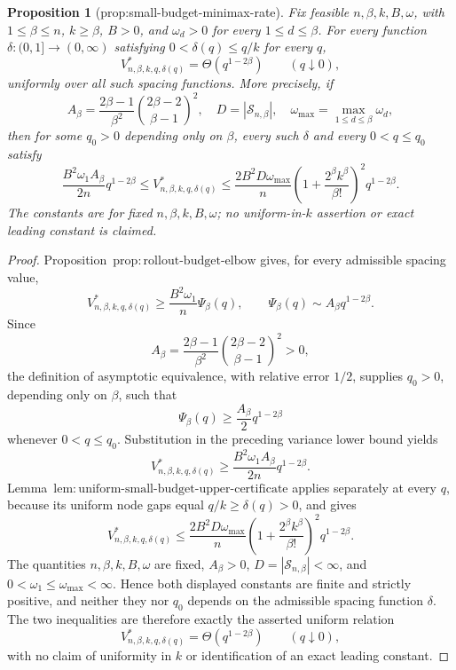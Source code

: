 \documentclass{article}
\newtheorem{proposition}{Proposition}
\begin{document}
\begin{proposition}[prop:small-budget-minimax-rate]\label{prop:small-budget-minimax-rate}
Fix feasible \(n,\beta,k,B,\omega\), with \(1\le\beta\le n\), \(k\ge\beta\), \(B>0\), and \(\omega_d>0\) for every \(1\le d\le\beta\).  For every function \(\delta:(0,1]\to(0,\infty)\) satisfying \(0<\delta(q)\le q/k\) for every \(q\),
\[
V^*_{n,\beta,k,q,\delta(q)}=\Theta(q^{1-2\beta})
\qquad(q\downarrow0),
\]
uniformly over all such spacing functions.  More precisely, if
\[
A_\beta=\frac{2\beta-1}{\beta^2}
\binom{2\beta-2}{\beta-1}^{\!2},
\quad D=|\mathcal S_{n,\beta}|,
\quad \omega_{\max}=\max_{1\le d\le\beta}\omega_d,
\]
then for some \(q_0>0\) depending only on \(\beta\), every such \(\delta\) and every \(0<q\le q_0\) satisfy
\[
\frac{B^2\omega_1A_\beta}{2n}q^{1-2\beta}
\le V^*_{n,\beta,k,q,\delta(q)}
\le\frac{2B^2D\omega_{\max}}{n}
\left(1+\frac{2^\beta k^\beta}{\beta!}\right)^2q^{1-2\beta}.
\]
The constants are for fixed \(n,\beta,k,B,\omega\); no uniform-in-\(k\) assertion or exact leading constant is claimed.
\end{proposition}
\begin{proof}
Proposition~\(\mathrm{prop{:}rollout\text{-}budget\text{-}elbow}\) gives, for every admissible spacing value,
\[
V^*_{n,\beta,k,q,\delta(q)}
\ge \frac{B^2\omega_1}{n}\Psi_\beta(q),
\qquad
\Psi_\beta(q)\sim A_\beta q^{1-2\beta}.
\]
Since
\[
A_\beta=\frac{2\beta-1}{\beta^2}
\binom{2\beta-2}{\beta-1}^{\!2}>0,
\]
the definition of asymptotic equivalence, with relative error \(1/2\), supplies \(q_0>0\), depending only on \(\beta\), such that
\[
\Psi_\beta(q)\ge \frac{A_\beta}{2}q^{1-2\beta}
\]
whenever \(0<q\le q_0\). Substitution in the preceding variance lower bound yields
\[
V^*_{n,\beta,k,q,\delta(q)}
\ge \frac{B^2\omega_1A_\beta}{2n}q^{1-2\beta}.
\]
Lemma~\(\mathrm{lem{:}uniform\text{-}small\text{-}budget\text{-}upper\text{-}certificate}\) applies separately at every \(q\), because its uniform node gaps equal \(q/k\ge\delta(q)>0\), and gives
\[
V^*_{n,\beta,k,q,\delta(q)}
\le \frac{2B^2D\omega_{\max}}{n}
\left(1+\frac{2^\beta k^\beta}{\beta!}\right)^2q^{1-2\beta}.
\]
The quantities \(n,\beta,k,B,\omega\) are fixed, \(A_\beta>0\), \(D=|\mathcal S_{n,\beta}|<\infty\), and \(0<\omega_1\le\omega_{\max}<\infty\). Hence both displayed constants are finite and strictly positive, and neither they nor \(q_0\) depends on the admissible spacing function \(\delta\). The two inequalities are therefore exactly the asserted uniform relation
\[
V^*_{n,\beta,k,q,\delta(q)}=\Theta\!\left(q^{1-2\beta}\right)
\qquad(q\downarrow0),
\]
with no claim of uniformity in \(k\) or identification of an exact leading constant.
\end{proof}
\end{document}
